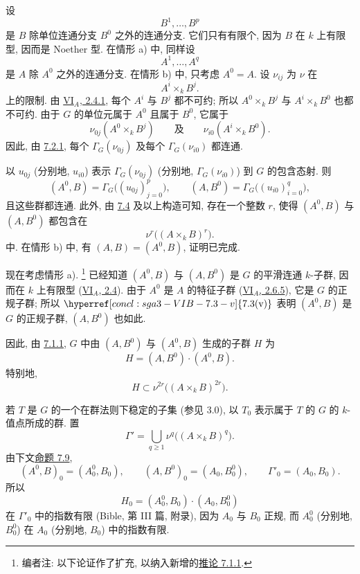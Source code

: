 设
\[
  B^1,\ldots,B^p
\]
是 \(B\) 除单位连通分支 \(B^0\) 之外的连通分支.
它们只有有限个, 因为 \(B\) 在 \(k\) 上有限型, 因而是 Noether 型.
在情形 \textup{a)} 中, 同样设
\[
  A^1,\ldots,A^q
\]
是 \(A\) 除 \(A^0\) 之外的连通分支.
在情形 \textup{b)} 中, 只考虑 \(A^0=A\).
设 \(\nu_{ij}\) 为 \(\nu\) 在
\[
  A^i\times_kB^j.
\]
上的限制. 由 \hyperref[cor:sga3-VIA-2.4.1]{VI\(_A\), 2.4.1},
每个 \(A^i\) 与 \(B^j\) 都不可约;
所以 \(A^0\times_kB^j\) 与 \(A^i\times_kB^0\) 也都不可约.
由于 \(G\) 的单位元属于 \(A^0\) 且属于 \(B^0\), 它属于
\[
  \nu_{0j}(A^0\times_kB^j)
  \qquad\text{及}\qquad
  \nu_{i0}(A^i\times_kB^0).
\]
因此, 由 \hyperref[cor:sga3-VIB-7.2.1]{7.2.1},
每个 \(\Gamma_G(\nu_{0j})\) 及每个 \(\Gamma_G(\nu_{i0})\) 都连通.

以 \(u_{0j}\) (分别地, \(u_{i0}\)) 表示
\(\Gamma_G(\nu_{0j})\) (分别地, \(\Gamma_G(\nu_{i0})\))
到 \(G\) 的包含态射. 则
\label{form:sga3-VIB-7.8-generated-connected-groups}%
\[
  (A^0,B)=\Gamma_G\bigl((u_{0j})_{j=0}^{p}\bigr),
  \qquad
  (A,B^0)=\Gamma_G\bigl((u_{i0})_{i=0}^{q}\bigr),
\]
且这些群都连通. 此外, 由 \hyperref[prop:sga3-VIB-7.4]{7.4}
及以上构造可知, 存在一个整数 \(r\),
使得 \((A^0,B)\) 与 \((A,B^0)\) 都包含在
\[
  \nu^r\bigl((A\times_kB)^r\bigr).
\]
中. 在情形 \textup{b)} 中, 有 \((A,B)=(A^0,B)\), 证明已完成.

现在考虑情形 \textup{a)}.%
\footnote{\label{note:sga3-VIB-80}编者注: 以下论证作了扩充,
以纳入新增的\hyperref[cor:sga3-VIB-7.1.1]{推论 7.1.1}.}
已经知道 \((A^0,B)\) 与 \((A,B^0)\) 是 \(G\) 的平滑连通
\(k\)-子群, 因而在 \(k\) 上有限型
(\hyperref[prop:sga3-VIA-2.4]{VI\(_A\), 2.4}).
由于 \(A^0\) 是 \(A\) 的特征子群
(\hyperref[thm:sga3-VIA-2.6.5]{VI\(_A\), 2.6.5}),
它是 \(G\) 的正规子群;
所以 \(\hyperref[concl:sga3-VIB-7.3-v]{7.3\textup{(v)}}\)
表明 \((A^0,B)\) 是 \(G\) 的正规子群,
\((A,B^0)\) 也如此.

因此, 由 \hyperref[cor:sga3-VIB-7.1.1]{7.1.1},
\(G\) 中由 \((A,B^0)\) 与 \((A^0,B)\) 生成的子群 \(H\) 为
\[
  H=(A,B^0)\cdot(A^0,B).
\]
特别地,
\label{form:sga3-VIB-7.8-H-contained}%
\[
  H\subset\nu^{2r}\bigl((A\times_kB)^{2r}\bigr).
\]

若 \(T\) 是 \(G\) 的一个在群法则下稳定的子集 (参见 \(3.0\)),
以 \(T_0\) 表示属于 \(T\) 的 \(G\) 的 \(k\)-值点所成的群.
置
\[
  \Gamma'
    =\bigcup_{q\geq1}\nu^q\bigl((A\times_kB)^q\bigr).
\]
由下文\hyperref[prop:sga3-VIB-7.9]{命题 7.9},
\label{form:sga3-VIB-7.8-rational-commutators}%
\[
  (A^0,B)_0=(A_0^0,B_0),
  \qquad
  (A,B^0)_0=(A_0,B_0^0),
  \qquad
  \Gamma'_0=(A_0,B_0).
\]
所以
\[
  H_0=(A_0^0,B_0)\cdot(A_0,B_0^0)
\]
在 \(\Gamma'_0\) 中的指数有限 (Bible, 第 III 篇, 附录),
因为 \(A_0\) 与 \(B_0\) 正规,
而 \(A_0^0\) (分别地, \(B_0^0\)) 在
\(A_0\) (分别地, \(B_0\)) 中的指数有限.

